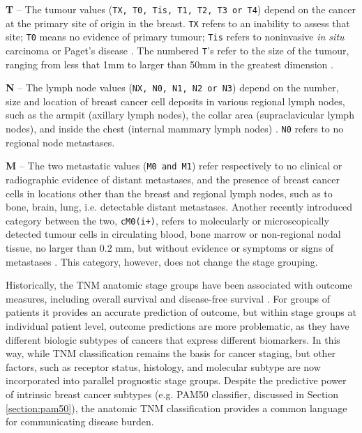     \textbf{T} – The tumour values (\texttt{TX, T0, Tis, T1, T2, T3 or T4}) depend on the cancer at the primary site of origin in the breast. \texttt{TX} refers to an inability to assess that site; \texttt{T0} means no evidence of primary tumour;  \texttt{Tis} refers to noninvasive \textit{in situ} carcinoma or Paget's disease \cite{Giuliano2017}. The numbered \texttt{T}'s refer to the size of the tumour, ranging from less that 1mm to larger than 50mm in the greatest dimension \cite{2017AJCCStaging}. 

    \textbf{N} – The lymph node values (\texttt{NX, N0, N1, N2 or N3}) depend on the number, size and location of breast cancer cell deposits in various regional lymph nodes, such as the armpit (axillary lymph nodes), the collar area (supraclavicular lymph nodes), and inside the chest (internal mammary lymph nodes) \cite{scatarige1990}. \texttt{N0} refers to no regional node metastases. 
    
    
    \textbf{M} – The two metastatic values (\texttt{M0 and M1}) refer respectively to no clinical or radiographic evidence of distant metastases, and the presence of breast cancer cells in locations other than the breast and regional lymph nodes, such as to bone, brain, lung, i.e. detectable distant metastases. Another recently introduced category between the two, \texttt{cM0(i+)}, refers to molecularly or microscopically detected tumour cells in circulating blood, bone marrow or non-regional nodal tissue, no larger than 0.2 mm, but without evidence or symptoms or signs of metastases \cite{Giuliano2017}. This category, however, does not change the stage grouping. 
    
    
    Historically, the TNM anatomic stage groups have been associated with outcome measures, including overall survival and disease-free survival \cite{Giuliano2017}.  For groups of patients it provides an accurate prediction of outcome, but within stage groups at individual patient level, outcome predictions are more problematic, as they have different biologic subtypes of cancers that express different biomarkers. In this way, while TNM classification remains the basis for cancer staging, but other factors, such as receptor status, histology, and molecular subtype are now incorporated into parallel prognostic stage groups. Despite the predictive power of intrinsic breast cancer subtypes (e.g. PAM50 classifier, discussed in Section \ref{section:pam50}),  the anatomic TNM classification provides a common language for communicating disease burden.

